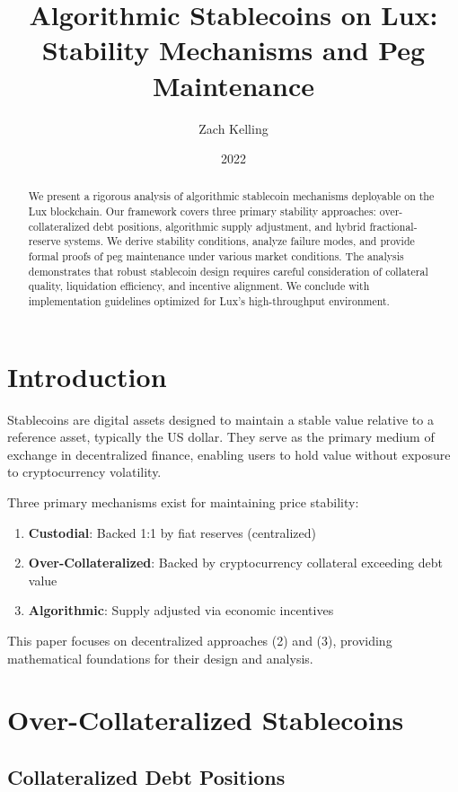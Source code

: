 \documentclass[11pt,a4paper]{article}
\title{Algorithmic Stablecoins on Lux: \\
Stability Mechanisms and Peg Maintenance}
\author{Zach Kelling}
\affil{Hanzo Industries \\ Lux Industries \\ Zoo Labs Foundation}
\date{2022}
\theoremstyle{definition}
\begin{document}
\maketitle

\begin{abstract}
We present a rigorous analysis of algorithmic stablecoin mechanisms deployable on the Lux blockchain. Our framework covers three primary stability approaches: over-collateralized debt positions, algorithmic supply adjustment, and hybrid fractional-reserve systems. We derive stability conditions, analyze failure modes, and provide formal proofs of peg maintenance under various market conditions. The analysis demonstrates that robust stablecoin design requires careful consideration of collateral quality, liquidation efficiency, and incentive alignment. We conclude with implementation guidelines optimized for Lux's high-throughput environment.
\end{abstract}

\section{Introduction}

Stablecoins are digital assets designed to maintain a stable value relative to a reference asset, typically the US dollar. They serve as the primary medium of exchange in decentralized finance, enabling users to hold value without exposure to cryptocurrency volatility.

Three primary mechanisms exist for maintaining price stability:

\begin{enumerate}
\item \textbf{Custodial}: Backed 1:1 by fiat reserves (centralized)
\item \textbf{Over-Collateralized}: Backed by cryptocurrency collateral exceeding debt value
\item \textbf{Algorithmic}: Supply adjusted via economic incentives
\end{enumerate}

This paper focuses on decentralized approaches (2) and (3), providing mathematical foundations for their design and analysis.

\section{Over-Collateralized Stablecoins}

\subsection{Collateralized Debt Positions}
\end{document}
